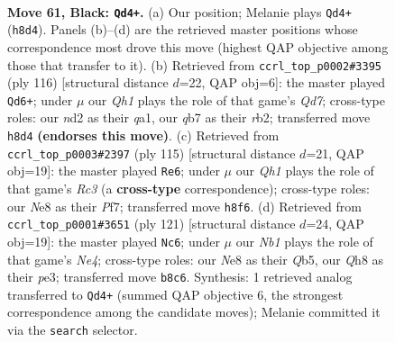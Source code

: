 \documentclass[11pt]{article}
\begin{document}
\clearpage

\begin{figure}[p]\centering
\begin{subfigure}{0.46\textwidth}\centering
\resizebox{\linewidth}{!}{%
\newchessgame
\chessboard[
  setfen={1n1kn2q/1Q6/8/8/P5K1/8/3N4/8 b - - 6 61},
  showmover=false,
  pgfstyle=straightmove, color=movearrow, markmove={h8-d4}
]}
\caption{}
\end{subfigure}\hfill
\begin{subfigure}{0.46\textwidth}\centering
\resizebox{\linewidth}{!}{%
\newchessgame
\chessboard[
  setfen={8/3Q4/1p3k2/1N6/8/5PK1/1r6/q7 w - - 19 59},
  showmover=false,
  pgfstyle=straightmove, color=movearrow, markmove={d7-d6}
]}
\caption{}
\end{subfigure}
\\[4pt]
\begin{subfigure}{0.46\textwidth}\centering
\resizebox{\linewidth}{!}{%
\newchessgame
\chessboard[
  setfen={8/5p1k/2r2n2/6Q1/8/5K1P/8/8 b - - 2 58},
  showmover=false,
  pgfstyle=straightmove, color=movearrow, markmove={c6-e6}
]}
\caption{}
\end{subfigure}\hfill
\begin{subfigure}{0.46\textwidth}\centering
\resizebox{\linewidth}{!}{%
\newchessgame
\chessboard[
  setfen={8/8/4k3/1q2n3/3Q4/4P3/8/3K4 b - - 9 61},
  showmover=false,
  pgfstyle=straightmove, color=movearrow, markmove={e5-c6}
]}
\caption{}
\end{subfigure}
\caption{\textbf{Move 61, Black: \texttt{Qd4+}.} (a) Our position; Melanie plays \texttt{Qd4+} (\texttt{h8d4}). Panels (b)--(d) are the retrieved master positions whose correspondence most drove this move (highest QAP objective among those that transfer to it). (b) Retrieved from \texttt{ccrl\_top\_p0002\#3395} (ply 116) [structural distance $d$=22, QAP obj=6]: the master played \texttt{Qd6+}; under $\mu$ our \emph{Qh1} plays the role of that game's \emph{Qd7}; cross-type roles: our \emph{n}d2 as their \emph{q}a1, our \emph{q}b7 as their \emph{r}b2; transferred move \texttt{h8d4} \textbf{(endorses this move)}. (c) Retrieved from \texttt{ccrl\_top\_p0003\#2397} (ply 115) [structural distance $d$=21, QAP obj=19]: the master played \texttt{Re6}; under $\mu$ our \emph{Qh1} plays the role of that game's \emph{Rc3} (a \textbf{cross-type} correspondence); cross-type roles: our \emph{N}e8 as their \emph{P}f7; transferred move \texttt{h8f6}. (d) Retrieved from \texttt{ccrl\_top\_p0001\#3651} (ply 121) [structural distance $d$=24, QAP obj=19]: the master played \texttt{Nc6}; under $\mu$ our \emph{Nb1} plays the role of that game's \emph{Ne4}; cross-type roles: our \emph{N}e8 as their \emph{Q}b5, our \emph{Q}h8 as their \emph{p}e3; transferred move \texttt{b8c6}. Synthesis: 1 retrieved analog transferred to \texttt{Qd4+} (summed QAP objective 6, the strongest correspondence among the candidate moves); Melanie committed it via the \texttt{search} selector.}
\label{fig:thought-m121}
\end{figure}
\end{document}
